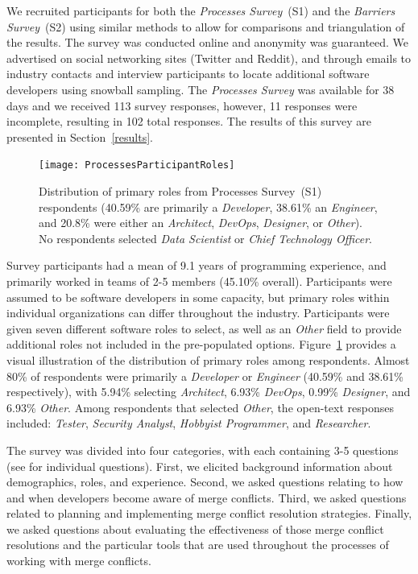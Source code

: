 We recruited participants for both the \textit{Processes Survey}~(S1) and the \textit{Barriers Survey}~(S2) using similar methods to allow for comparisons and triangulation of the results.
The survey was conducted online and anonymity was guaranteed.
We advertised on social networking sites (Twitter and Reddit), and through emails to industry contacts and interview participants to locate additional software developers using snowball sampling.
The \textit{Processes Survey} was available for 38 days and we received 113 survey responses, however, 11 responses were incomplete, resulting in 102 total responses.
The results of this survey are presented in Section~\ref{results}.

\begin{figure}[!htbp]
\centering
\texttt{[image: ProcessesParticipantRoles]}
\caption{Distribution of primary roles from Processes Survey~(S1) respondents (40.59\% are primarily a \textit{Developer}, 38.61\% an \textit{Engineer}, and 20.8\% were either an \textit{Architect}, \textit{DevOps}, \textit{Designer}, or \textit{Other}). No respondents selected \textit{Data Scientist} or \textit{Chief Technology Officer}.}
\label{processes_roles}
\end{figure}

Survey participants had a mean of 9.1 years of programming experience, and primarily worked in teams of 2-5 members (45.10\% overall).
Participants were assumed to be software developers in some capacity, but primary roles within individual organizations can differ throughout the industry.
Participants were given seven different software roles to select, as well as an \textit{Other} field to provide additional roles not included in the pre-populated options.
Figure~\ref{processes_roles} provides a visual illustration of the distribution of primary roles among respondents.
Almost 80\% of respondents were primarily a \textit{Developer} or \textit{Engineer} (40.59\% and 38.61\% respectively), with 5.94\% selecting \textit{Architect}, 6.93\% \textit{DevOps}, 0.99\% \textit{Designer}, and 6.93\% \textit{Other}.
Among respondents that selected \textit{Other}, the open-text responses included: \textit{Tester}, \textit{Security Analyst}, \textit{Hobbyist Programmer}, and \textit{Researcher}.

The survey was divided into four categories, with each containing 3-5 questions (see \cite{companion_site} for individual questions).
First, we elicited background information about demographics, roles, and experience.
Second, we asked questions relating to how and when developers become aware of merge conflicts.
Third, we asked questions related to planning and implementing merge conflict resolution strategies.
Finally, we asked questions about evaluating the effectiveness of those merge conflict resolutions and the particular tools that are used throughout the processes of working with merge conflicts.

